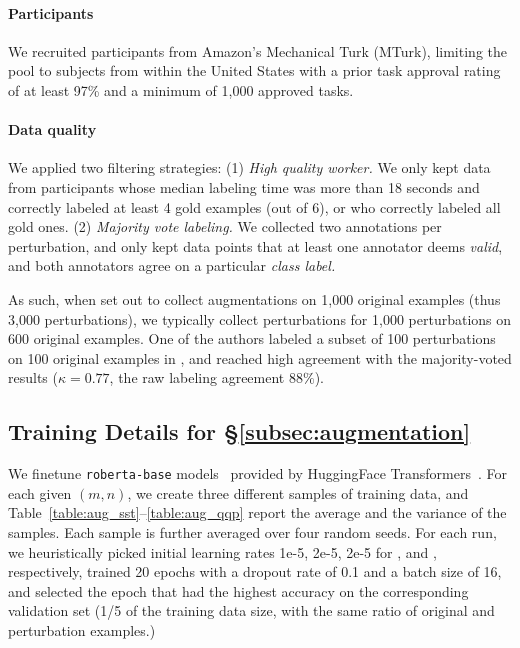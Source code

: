 \paragraph{Participants}
We recruited participants from Amazon's Mechanical Turk (MTurk), limiting the pool to subjects from within the United States with a prior task approval rating of at least 97\% and a minimum of 1,000 approved tasks.

\paragraph{Data quality}
We applied two filtering strategies: 
(1) \emph{High quality worker.} 
We only kept data from participants whose median labeling time was more than 18 seconds and correctly labeled at least 4 gold examples (out of 6), or who correctly labeled all gold ones.
(2) \emph{Majority vote labeling.}
We collected two annotations per perturbation, and only kept data points that at least one annotator deems \emph{valid}, and both annotators agree on a particular \emph{class label.}

As such, when set out to collect augmentations on 1,000 original examples (thus 3,000 perturbations), we typically collect perturbations for 1,000 perturbations on 600 original examples.
One of the authors labeled a subset of 100 perturbations on 100 original examples in \sst, and reached high agreement with the majority-voted results ($\kappa=0.77$, the raw labeling agreement $88\%$).


\subsection{Training Details for \S\ref{subsec:augmentation}}
\label{appendix:data_collection}

We finetune \texttt{roberta-base} models~\cite{liu2019roberta} provided by HuggingFace Transformers~\cite{Wolf2019HuggingFacesTS}.
For each given $(m,n)$, we create three different samples of training data, and Table~\ref{table:aug_sst}--\ref{table:aug_qqp} report the average and the variance of the samples.
Each sample is further averaged over four random seeds.
For each run, we heuristically picked initial learning rates 1e-5, 2e-5, 2e-5 for \sst, \nli and \qqp, respectively, trained 20 epochs with a dropout rate of 0.1 and a batch size of 16, and selected the epoch that had the highest accuracy on the corresponding validation set (1/5 of the training data size, with the same ratio of original and perturbation examples.)

